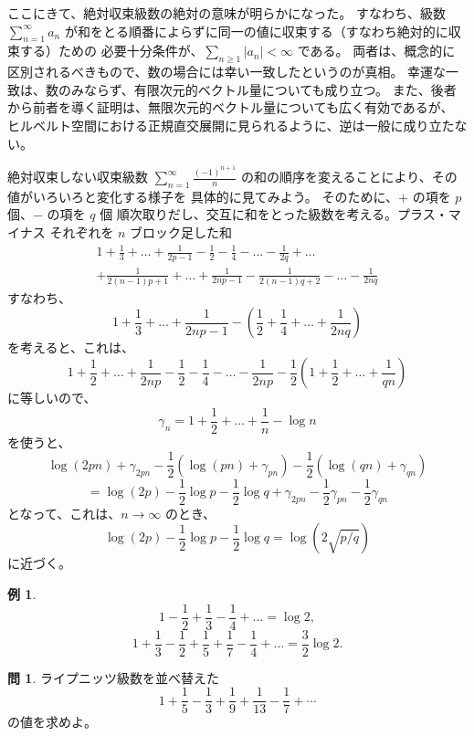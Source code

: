 \documentclass[a4paper]{jsarticle}
\theoremstyle{definition}
\newtheorem{Example}[Theorem]{例}
\newtheorem{Exercise}{問}%
\theoremstyle{remark}
\begin{document}
ここにきて、絶対収束級数の絶対の意味が明らかになった。
すなわち、級数 $\sum_{n=1}^\infty a_n$ が和をとる順番によらずに同一の値に収束する（すなわち絶対的に収束する）ための
必要十分条件が、$\sum_{n \geq 1} |a_n| < \infty$ である。
両者は、概念的に区別されるべきもので、数の場合には幸い一致したというのが真相。
幸運な一致は、数のみならず、有限次元的ベクトル量についても成り立つ。
また、後者から前者を導く証明は、無限次元的ベクトル量についても広く有効であるが、
ヒルベルト空間における正規直交展開に見られるように、逆は一般に成り立たない。


\bigskip
絶対収束しない収束級数 $\sum_{n=1}^\infty \frac{(-1)^{n+1}}{n}$ 
の和の順序を変えることにより、その値がいろいろと変化する様子を
具体的に見てみよう。
そのために、$+$ の項を $p$ 個、$-$ の項を $q$ 個
順次取りだし、交互に和をとった級数を考える。プラス・マイナス
それぞれを $n$ ブロック足した和
\begin{multline}
1 + \frac{1}{3} + \dots + \frac{1}{2p-1} 
- \frac{1}{2} - \frac{1}{4} - \dots - \frac{1}{2q} 
+ \dots \\
+ \frac{1}{2(n-1)p+1} + \dots + \frac{1}{2np-1} 
- \frac{1}{2(n-1)q+2} - \dots - \frac{1}{2nq}
\end{multline}
すなわち、
\[
1 + \frac{1}{3} + \dots + \frac{1}{2np-1} 
- \left( \frac{1}{2} + \frac{1}{4} + \dots + \frac{1}{2nq} \right)
\]
を考えると、これは、
\[
1 + \frac{1}{2} + \dots + \frac{1}{2np} 
- \frac{1}{2} - \frac{1}{4} - \dots - \frac{1}{2np} 
- \frac{1}{2} \left( 1 + \frac{1}{2} + \dots + \frac{1}{qn} \right)
\]
に等しいので、
\[
\gamma_n = 1 + \frac{1}{2} + \dots + \frac{1}{n} - \log n
\]
を使うと、
\[
\log(2pn) + \gamma_{2pn} - \frac{1}{2}(\log(pn) + \gamma_{pn}) 
- \frac{1}{2}(\log(qn) + \gamma_{qn})
\]
\[
= \log(2p) - \frac{1}{2}\log p - \frac{1}{2}\log q 
+ \gamma_{2pn} - \frac{1}{2}\gamma_{pn} - \frac{1}{2}\gamma_{qn} 
\]
となって、これは、$n \to \infty$ のとき、
\[
\log(2p) - \frac{1}{2}\log p - \frac{1}{2} \log q 
= \log(2\sqrt{p/q}) 
\]
に近づく。

\begin{Example}
\[
1 - \frac{1}{2} + \frac{1}{3} - \frac{1}{4} + \dots = \log 2, 
\]
\[
1 + \frac{1}{3} - \frac{1}{2} + \frac{1}{5} + \frac{1}{7} 
- \frac{1}{4} + \dots = \frac{3}{2}\log 2. 
\]
\end{Example}

\begin{Exercise}
ライプニッツ級数を並べ替えた
\[ 
1 + \frac{1}{5} - \frac{1}{3} + \frac{1}{9} + \frac{1}{13} - \frac{1}{7} + \cdots 
\]
の値を求めよ。
\end{Exercise}
\end{document}
